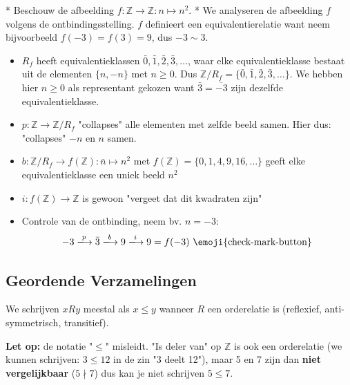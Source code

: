 \begin{niceexample}*
    Beschouw de afbeelding $f : \mathbb{Z} \to \mathbb{Z} : n \mapsto n^2$.
    \nextpart[]*
    We analyseren de afbeelding $f$ volgens de ontbindingsstelling. $f$ definieert een equivalentierelatie want neem bijvoorbeeld $f(-3) = f(3) = 9$, dus $-3 \sim 3$.
    \begin{itemize}
        \item $R_f$ heeft equivalentieklassen $\bar{0}, \bar{1}, \bar{2}, \bar{3}, \dots$, waar elke equivalentieklasse bestaat uit de elementen $\{n, -n\}$ met $n \ge 0$. Dus $\mathbb{Z}/R_f = \{\bar{0}, \bar{1}, \bar{2}, \bar{3}, \dots\}$. We hebben hier $n \ge 0$ als representant gekozen want $\bar{3} = \overline{-3}$ zijn dezelfde equivalentieklasse.
        \item $p : \mathbb{Z} \to \mathbb{Z}/R_f$ "collapses" alle elementen met zelfde beeld samen. Hier dus: "collapses" $-n$ en $n$ samen.
        \item $b : \mathbb{Z}/R_f \to f(\mathbb{Z}) : \bar{n} \mapsto n^2$ met $f(\mathbb{Z}) = \{0, 1, 4, 9, 16, \dots\}$ geeft elke equivalentieklasse een uniek beeld $n^2$
        \item $i : f(\mathbb{Z}) \to \mathbb{Z}$ is gewoon "vergeet dat dit kwadraten zijn"
        \item Controle van de ontbinding, neem bv. $n= -3$:
        \begin{equation*}
            -3 \xlongrightarrow{p} \bar{3} \xlongrightarrow{b} 9 \xlongrightarrow{i} 9 = f(-3) \text{ \emoji{check-mark-button}}
        \end{equation*}
    \end{itemize}
\end{niceexample}

\subsection{Geordende Verzamelingen}

We schrijven $xRy$ meestal als $x \le y$ wanneer $R$ een orderelatie is (reflexief, anti-symmetrisch, transitief).

\textbf{Let op:} de notatie "$\le$" misleidt. "Is deler van" op $\mathbb{Z}$ is ook een orderelatie (we kunnen schrijven: $3 \le 12$ in de zin "3 deelt 12"), maar 5 en 7 zijn dan \textbf{niet vergelijkbaar} ($5 \nmid 7$) dus kan je niet schrijven $5 \le 7$.


